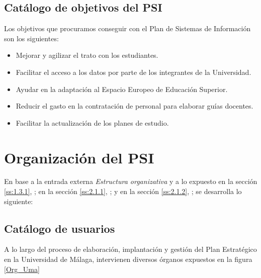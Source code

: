 \documentclass[11pt,a4paper,spanish,twoside]{report}
\begin{document}
\subsection{Catálogo de objetivos del PSI} \label{ss:2.1.2}
Los objetivos que procuramos conseguir con el Plan de Sistemas de Información 
son los siguientes:
\begin{itemize}
  \item Mejorar y agilizar el trato con los estudiantes.
  \item Facilitar el acceso a los datos por parte de los integrantes de la 
    Universidad.
  \item Ayudar en la adaptación al Espacio Europeo de Educación Superior.
  \item Reducir el gasto en la contratación de personal para elaborar guías 
    docentes.
  \item Facilitar la actualización de los planes de estudio.
\end{itemize}

\section{Organización del PSI}
En base a la entrada externa \emph{Estructura organizativa} y a lo expuesto
en la sección \vref{ss:1.3.1}, \emph{}; en la sección
\vref{ss:2.1.1}, \emph{}; y en la sección \vref{ss:2.1.2},
\emph{}; se desarrolla lo siguiente:

\subsection{Catálogo de usuarios} \label{ss:2.2.1}
A lo largo del proceso de elaboración, implantación y gestión del Plan 
Estratégico en la Universidad de Málaga, intervienen diversos órganos expuestos 
en la figura \ref{Org_Uma}

\end{document}
